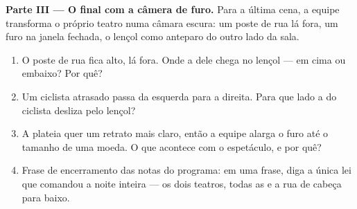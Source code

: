 \begin{problem}
\medskip\noindent\textbf{Parte III --- O final com a câmera de furo.}
Para a última cena, a equipe transforma o próprio teatro numa câmara
escura: um poste de rua lá fora, um furo na janela fechada, o lençol
como anteparo do outro lado da sala.
\begin{enumerate}[resume]
  \item O poste de rua fica alto, lá fora. Onde a  dele chega
        no lençol --- em cima ou embaixo? Por quê?
  \item Um ciclista atrasado passa da esquerda para a direita. Para
        que lado a  do ciclista desliza pelo lençol?
  \item A plateia quer um retrato mais claro, então a equipe alarga o
        furo até o tamanho de uma moeda. O que acontece com o
        espetáculo, e por quê?
  \item Frase de encerramento das notas do programa: em uma frase,
        diga a única lei que comandou a noite inteira --- os dois
        teatros, todas as  e a rua de cabeça para baixo.
\end{enumerate}
\end{problem}
